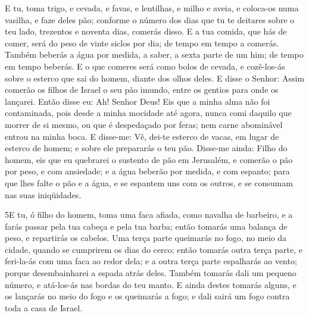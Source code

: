 E tu, toma trigo, e cevada, e favas, e lentilhas, e milho e aveia,
e coloca-os numa vasilha, e faze deles pão; conforme o número dos
dias que tu te deitares sobre o teu lado, trezentos e noventa dias,
comerás disso. E a tua comida, que hás de comer, será do peso
de vinte siclos por dia; de tempo em tempo a comerás. Também
beberás a água por medida, a saber, a sexta parte de um him; de
tempo em tempo beberás. E o que comeres será como bolos de
cevada, e cozê-los-ás sobre o esterco que sai do homem, diante dos
olhos deles. E disse o Senhor: Assim comerão os filhos de
Israel o seu pão imundo, entre os gentios para onde os lançarei.
Então disse eu: Ah! Senhor Deus! Eis que a minha alma não foi
contaminada, pois desde a minha mocidade até agora, nunca comi
daquilo que morrer de si mesmo, ou que é despedaçado por feras; nem
carne abominável entrou na minha boca. E disse-me: Vê, dei-te
esterco de vacas, em lugar de esterco de homem; e sobre ele
prepararás o teu pão. Disse-me ainda: Filho do homem, eis que
eu quebrarei o sustento de pão em Jerusalém, e comerão o pão por
peso, e com ansiedade; e a água beberão por medida, e com espanto;
para que lhes falte o pão e a água, e se espantem uns com os
outros, e se consumam nas suas iniqüidades.

\medskip

\lettrine{5} E tu, ó filho do homem, toma uma faca afiada,
como navalha de barbeiro, e a farás passar pela tua cabeça e pela
tua barba; então tomarás uma balança de peso, e repartirás os
cabelos. Uma terça parte queimarás no fogo, no meio da cidade,
quando se cumprirem os dias do cerco; então tomarás outra terça
parte, e feri-la-ás com uma faca ao redor dela; e a outra terça
parte espalharás ao vento; porque desembainharei a espada atrás
deles. Também tomarás dali um pequeno número, e atá-los-ás nas
bordas do teu manto. E ainda destes tomarás alguns, e os
lançarás no meio do fogo e os queimarás a fogo; e dali sairá um fogo
contra toda a casa de Israel.

